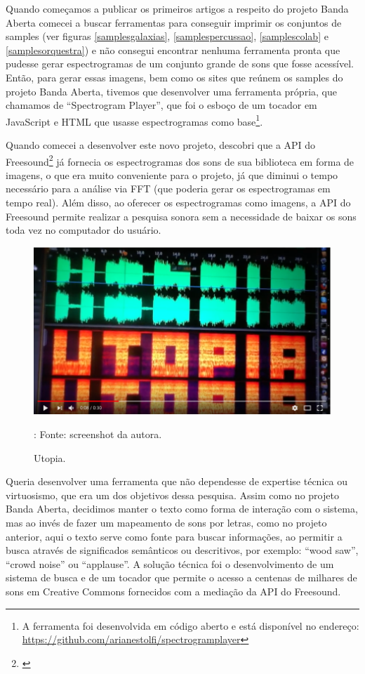 Quando começamos a publicar os primeiros artigos a respeito do projeto Banda Aberta comecei a buscar ferramentas para conseguir imprimir os conjuntos de samples (ver figuras \ref{samplesgalaxias}, \ref{samplespercussao}, \ref{samplescolab} e \ref{samplesorquestra}) e não consegui encontrar nenhuma ferramenta pronta que pudesse gerar espectrogramas de um conjunto grande de sons que fosse acessível. Então, para gerar essas imagens, bem como os sites que reúnem os samples do projeto Banda Aberta, tivemos que desenvolver uma ferramenta própria, que chamamos de ``Spectrogram Player'', que foi o esboço de um tocador em JavaScript e HTML que usasse espectrogramas como base\footnote{A ferramenta foi desenvolvida em código aberto e está disponível no endereço: \url{https://github.com/arianestolfi/spectrogramplayer}}. 

Quando comecei a desenvolver este novo projeto, descobri que a API do Freesound\footnote{\cite{Akkermans2011}} já fornecia os espectrogramas dos sons de sua biblioteca em forma de imagens, o que era muito conveniente para o projeto, já que diminui o tempo necessário para a análise via FFT (que poderia gerar os espectrogramas em tempo real). Além disso, ao oferecer os espectrogramas como imagens, a API do Freesound permite realizar a pesquisa sonora sem a necessidade de baixar os sons toda vez no computador do usuário.

\begin{figure}
\includegraphics[width=1\textwidth]{pictures/cap4/utopia}
\caption{\label{utopia}Utopia.}
\legend: Fonte: screenshot da autora.
\label{utopia}
\end{figure}

Queria desenvolver uma ferramenta que não dependesse de expertise técnica ou virtuosismo, que era um dos objetivos dessa pesquisa. Assim como no projeto Banda Aberta, decidimos manter o texto como forma de interação com o sistema, mas ao invés de fazer um mapeamento de sons por letras, como no projeto anterior, aqui o texto serve como fonte para buscar informações, ao permitir a busca através de significados semânticos ou descritivos, por exemplo: ``wood saw'', ``crowd noise'' ou ``applause''. A solução técnica foi o desenvolvimento de um sistema de busca e de um tocador que permite o acesso a centenas de milhares de sons em Creative Commons fornecidos com a mediação da API do Freesound.


